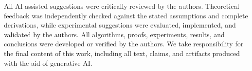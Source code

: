 \documentclass[twoside]{article} %
\theoremstyle{plain}
\theoremstyle{definition}
\theoremstyle{remark}
\begin{document}
All AI-assisted suggestions were critically reviewed by the authors. Theoretical feedback was independently checked against the stated assumptions and complete derivations, while experimental suggestions were evaluated, implemented, and validated by the authors. All algorithms, proofs, experiments, results, and conclusions were developed or verified by the authors. We take responsibility for the final content of this work, including all text, claims, and artifacts produced with the aid of generative AI.





\end{document}

